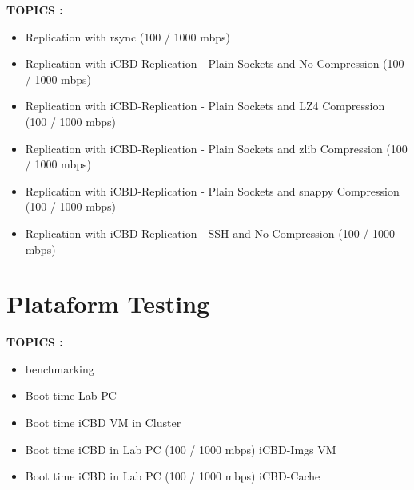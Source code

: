 \textbf{TOPICS :}
\begin{itemize}
	\item Replication with rsync (100 / 1000 mbps)
	\item Replication with iCBD-Replication - Plain Sockets and No Compression (100 / 1000 mbps)
	\item Replication with iCBD-Replication - Plain Sockets and LZ4 Compression (100 / 1000 mbps)
	\item Replication with iCBD-Replication - Plain Sockets and zlib Compression (100 / 1000 mbps)
	\item Replication with iCBD-Replication - Plain Sockets and snappy Compression (100 / 1000 mbps)
	\item Replication with iCBD-Replication - SSH and No Compression (100 / 1000 mbps)
\end{itemize}




\section{Plataform Testing}
\label{sub:integration_testing}


\textbf{TOPICS :}
\begin{itemize}
	\item benchmarking 
	\item Boot time Lab PC
	\item Boot time iCBD VM in Cluster
	\item Boot time iCBD in Lab PC (100 / 1000 mbps) iCBD-Imgs VM
	\item Boot time iCBD in Lab PC (100 / 1000 mbps) iCBD-Cache
\end{itemize}